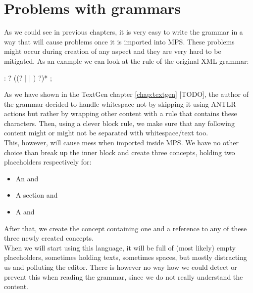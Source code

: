 \chapter{Problems with grammars}
\label{chap:problems_with_grammars}

As we could see in previous chapters, it is very easy to write the grammar in a way that will cause problems once it is imported into MPS. These problems might occur during creation of any aspect and they are very hard to be mitigated. As an example we can look at the  rule of the original XML grammar:

\begin{antlr}
	 :   ? ((? |  | ) ?)* ;
\end{antlr}

As we have shown in the TextGen chapter \ref{chap:textgen} [TODO], the author of the grammar decided to handle whitespace not by skipping it using ANTLR actions but rather by wrapping other content with a rule that contains these characters. Then, using a clever block rule, we make sure that any following content might or might not be separated with whitespace/text too.
\\

This, however, will cause mess when imported inside MPS. We have no other choice than break up the inner block and create three concepts, holding two placeholders respectively for:

\begin{itemize}
	\item An  and 
	\item A  section and 
	\item A  and 
\end{itemize}

After that, we create the  concept containing one  and a reference to any of these three newly created concepts.
\\

When we will start using this language, it will be full of (most likely) empty  placeholders, sometimes holding texts, sometimes spaces, but mostly distracting us and polluting the editor. There is however no way how we could detect or prevent this when reading the grammar, since we do not really understand the content.
\\

